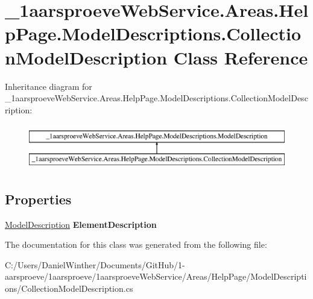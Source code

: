 \hypertarget{class__1aarsproeve_web_service_1_1_areas_1_1_help_page_1_1_model_descriptions_1_1_collection_model_description}{}\section{\+\_\+1aarsproeve\+Web\+Service.\+Areas.\+Help\+Page.\+Model\+Descriptions.\+Collection\+Model\+Description Class Reference}
\label{class__1aarsproeve_web_service_1_1_areas_1_1_help_page_1_1_model_descriptions_1_1_collection_model_description}
Inheritance diagram for \+\_\+1aarsproeve\+Web\+Service.\+Areas.\+Help\+Page.\+Model\+Descriptions.\+Collection\+Model\+Description\+:\begin{figure}[H]
\begin{center}
\leavevmode
\includegraphics[height=2.000000cm]{class__1aarsproeve_web_service_1_1_areas_1_1_help_page_1_1_model_descriptions_1_1_collection_model_description}
\end{center}
\end{figure}
\subsection*{Properties}
\begin{DoxyCompactItemize}
\item 
\hypertarget{class__1aarsproeve_web_service_1_1_areas_1_1_help_page_1_1_model_descriptions_1_1_collection_model_description_a9f59a1485146c386bb767ff88380e3b2}{}\hyperlink{class__1aarsproeve_web_service_1_1_areas_1_1_help_page_1_1_model_descriptions_1_1_model_description}{Model\+Description} {\bfseries Element\+Description}\label{class__1aarsproeve_web_service_1_1_areas_1_1_help_page_1_1_model_descriptions_1_1_collection_model_description_a9f59a1485146c386bb767ff88380e3b2}

\end{DoxyCompactItemize}


The documentation for this class was generated from the following file\+:\begin{DoxyCompactItemize}
\item 
C\+:/\+Users/\+Daniel\+Winther/\+Documents/\+Git\+Hub/1-\/aarsproeve/1aarsproeve/1aarsproeve\+Web\+Service/\+Areas/\+Help\+Page/\+Model\+Descriptions/Collection\+Model\+Description.\+cs\end{DoxyCompactItemize}
